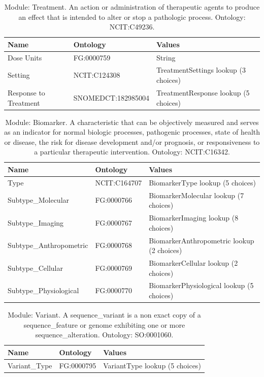 \documentclass{article}
\begin{document}
\begin{table}[htb]
\begin{tabular}{lll}
Name & Ontology & Values \\
\hline
Dose Units & FG:0000759 & String \\
Setting & NCIT:C124308 & TreatmentSettings lookup (3 choices) \\
Response to Treatment & SNOMEDCT:182985004 & TreatmentResponse lookup (5 choices) \\
\hline
\end{tabular}
\caption[Module: Treatment]{\label{table:table12} Module: Treatment. An action or administration of therapeutic agents to produce an effect that is intended to alter or stop a pathologic process. Ontology: NCIT:C49236. }
\end{table}

\begin{table}[htb]
\begin{tabular}{lll}
Name & Ontology & Values \\
\hline
Type & NCIT:C164707 & BiomarkerType lookup (5 choices) \\
Subtype_Molecular & FG:0000766 & BiomarkerMolecular lookup (7 choices) \\
Subtype_Imaging & FG:0000767 & BiomarkerImaging lookup (8 choices) \\
Subtype_Anthropometric & FG:0000768 & BiomarkerAnthropometric lookup (2 choices) \\
Subtype_Cellular & FG:0000769 & BiomarkerCellular lookup (2 choices) \\
Subtype_Physiological & FG:0000770 & BiomarkerPhysiological lookup (5 choices) \\
\hline
\end{tabular}
\caption[Module: Biomarker]{\label{table:table13} Module: Biomarker. A characteristic that can be objectively measured and serves as an indicator for normal biologic processes, pathogenic processes, state of health or disease, the risk for disease development and/or prognosis, or responsiveness to a particular therapeutic intervention. Ontology: NCIT:C16342. }
\end{table}

\begin{table}[htb]
\begin{tabular}{lll}
Name & Ontology & Values \\
\hline
Variant_Type & FG:0000795 & VariantType lookup (5 choices) \\
\hline
\end{tabular}
\caption[Module: Variant]{\label{table:table14} Module: Variant. A sequence_variant is a non exact copy of a sequence_feature or genome exhibiting one or more sequence_alteration. Ontology: SO:0001060. }
\end{table}
\end{document}
